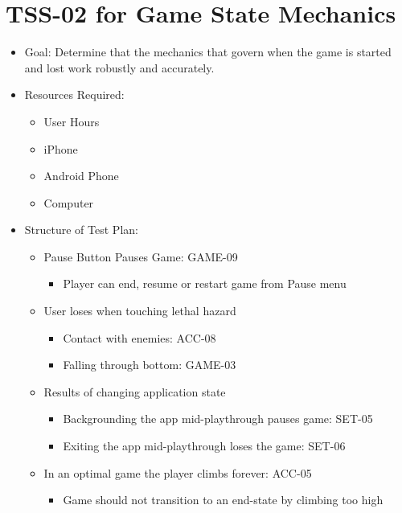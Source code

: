 \section{TSS-02 for Game State Mechanics }
\begin{itemize}
\item Goal: Determine that the mechanics that govern when the game is started
and lost work robustly and accurately.
\item Resources Required: 

\begin{itemize}
\item User Hours 
\item iPhone 
\item Android Phone 
\item Computer 
\end{itemize}
\item Structure of Test Plan: 

\begin{itemize}
\item Pause Button Pauses Game: GAME-09

\begin{itemize}
\item Player can end, resume or restart game from Pause menu 
\end{itemize}
\item User loses when touching lethal hazard 

\begin{itemize}
\item Contact with enemies: ACC-08
\item Falling through bottom: GAME-03
\end{itemize}
\item Results of changing application state 

\begin{itemize}
\item Backgrounding the app mid-playthrough pauses game: SET-05
\item Exiting the app mid-playthrough loses the game: SET-06 
\end{itemize}
\item In an optimal game the player climbs forever: ACC-05 

\begin{itemize}
\item Game should not transition to an end-state by climbing too high
\end{itemize}
\end{itemize}
\end{itemize}

